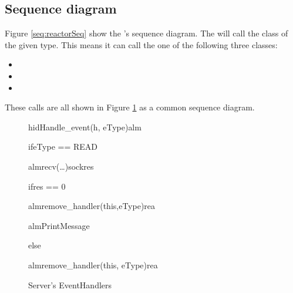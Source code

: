 \documentclass[Main]{subfiles}
\begin{document}
\subsection{Sequence diagram}
Figure \ref{seq:reactorSeq} show the 's sequence diagram.
The  will call the class of the given type.
This means it can call the one of the following three classes:
\begin{itemize}
	\item {}
	\item {}
	\item {}
\end{itemize}
These calls are all shown in Figure \ref{fig:SererEventHandler} as a common sequence diagram.
\newpage
\begin{figure}[htbp]
\begin {sequencediagram}

	\begin{messcall}{hid}{Handle\_event(h, eType)}{alm}

		\begin{sdblock}{if}{eType == READ}
			\begin{call}{alm}{recv(\dots)}{sock}{res}
			\end{call}

			\begin{sdblock}{if}{res == 0}
				\begin{messcall}{alm}{remove\_handler(this,eType)}{rea}
				\end{messcall}


			\end{sdblock}

			\begin{callself}{alm}{PrintMessage}{}
			\end{callself}
		\end{sdblock}

		\begin{sdblock}{else}{}
			\begin{call}{alm}{remove\_handler(this, eType)}{rea}{}
			\end{call}
		\end{sdblock}

	\end{messcall}



\end{sequencediagram}

\caption{Server's EventHandlers}
\label{fig:SererEventHandler}
\end{figure}
\end{document}

